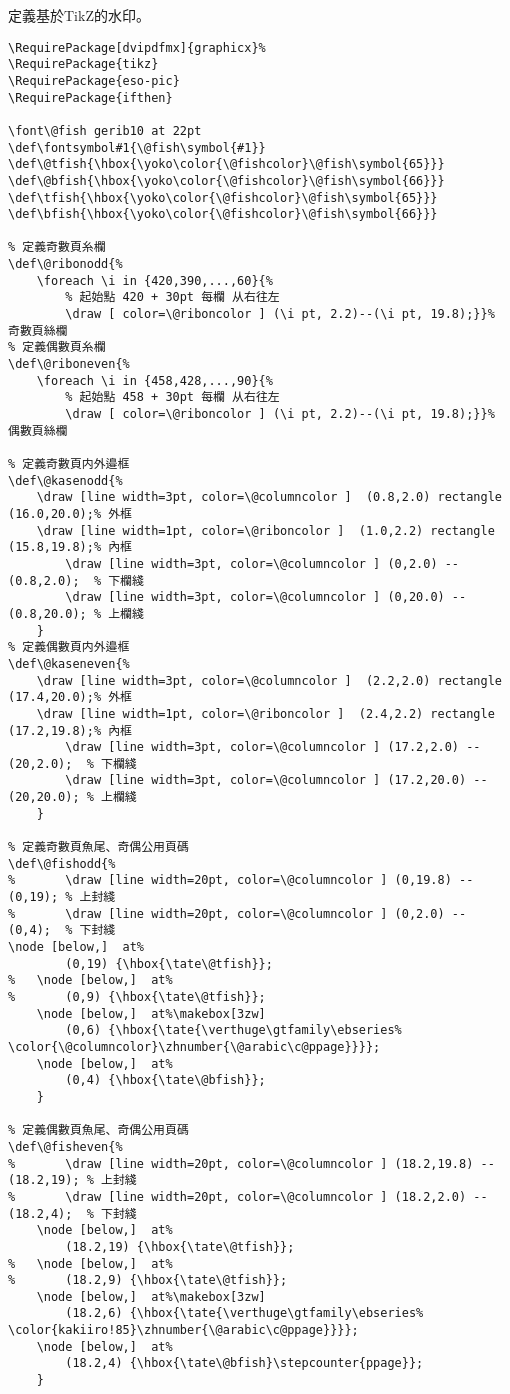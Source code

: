 \par%
定義基於TikZ的水印。
\begin{lstlisting}[firstnumber=417]
%%%%%%	自定義的水印命令 %頁眉、頁碼設置
\RequirePackage[dvipdfmx]{graphicx}%
\RequirePackage{tikz}
\RequirePackage{eso-pic}
\RequirePackage{ifthen}

\font\@fish gerib10 at 22pt
\def\fontsymbol#1{\@fish\symbol{#1}}
\def\@tfish{\hbox{\yoko\color{\@fishcolor}\@fish\symbol{65}}}
\def\@bfish{\hbox{\yoko\color{\@fishcolor}\@fish\symbol{66}}}
\def\tfish{\hbox{\yoko\color{\@fishcolor}\@fish\symbol{65}}}
\def\bfish{\hbox{\yoko\color{\@fishcolor}\@fish\symbol{66}}}

% 定義奇數頁糸欄
\def\@ribonodd{%
	\foreach \i in {420,390,...,60}{%
		% 起始點 420 + 30pt 每欄 从右往左
		\draw [ color=\@riboncolor ] (\i pt, 2.2)--(\i pt, 19.8);}}% 奇數頁絲欄 
% 定義偶數頁糸欄
\def\@riboneven{%
	\foreach \i in {458,428,...,90}{% 
		% 起始點 458 + 30pt 每欄 从右往左
		\draw [ color=\@riboncolor ] (\i pt, 2.2)--(\i pt, 19.8);}}% 偶數頁絲欄 

% 定義奇數頁内外邉框
\def\@kasenodd{%
	\draw [line width=3pt, color=\@columncolor ]  (0.8,2.0) rectangle (16.0,20.0);% 外框 
	\draw [line width=1pt, color=\@riboncolor ]  (1.0,2.2) rectangle (15.8,19.8);% 內框 
		\draw [line width=3pt, color=\@columncolor ] (0,2.0) -- (0.8,2.0);  % 下欄綫
		\draw [line width=3pt, color=\@columncolor ] (0,20.0) -- (0.8,20.0); % 上欄綫
	}
% 定義偶數頁内外邉框
\def\@kaseneven{%
	\draw [line width=3pt, color=\@columncolor ]  (2.2,2.0) rectangle (17.4,20.0);% 外框 
	\draw [line width=1pt, color=\@riboncolor ]  (2.4,2.2) rectangle (17.2,19.8);% 內框 
		\draw [line width=3pt, color=\@columncolor ] (17.2,2.0) -- (20,2.0);  % 下欄綫
		\draw [line width=3pt, color=\@columncolor ] (17.2,20.0) -- (20,20.0); % 上欄綫
	}

% 定義奇數頁魚尾、奇偶公用頁碼
\def\@fishodd{%
%		\draw [line width=20pt, color=\@columncolor ] (0,19.8) -- (0,19); % 上封綫
%		\draw [line width=20pt, color=\@columncolor ] (0,2.0) -- (0,4);  % 下封綫
\node [below,]  at%
		(0,19) {\hbox{\tate\@tfish}};
%	\node [below,]  at%
%		(0,9) {\hbox{\tate\@tfish}};
	\node [below,]  at%\makebox[3zw]
		(0,6) {\hbox{\tate{\verthuge\gtfamily\ebseries%
\color{\@columncolor}\zhnumber{\@arabic\c@ppage}}}};
	\node [below,]  at%
		(0,4) {\hbox{\tate\@bfish}};
	}

% 定義偶數頁魚尾、奇偶公用頁碼
\def\@fisheven{%
%		\draw [line width=20pt, color=\@columncolor ] (18.2,19.8) -- (18.2,19); % 上封綫
%		\draw [line width=20pt, color=\@columncolor ] (18.2,2.0) -- (18.2,4);  % 下封綫
	\node [below,]  at%
		(18.2,19) {\hbox{\tate\@tfish}};
%	\node [below,]  at%
%		(18.2,9) {\hbox{\tate\@tfish}};
	\node [below,]  at%\makebox[3zw]
		(18.2,6) {\hbox{\tate{\verthuge\gtfamily\ebseries%
\color{kakiiro!85}\zhnumber{\@arabic\c@ppage}}}};
	\node [below,]  at%
		(18.2,4) {\hbox{\tate\@bfish}\stepcounter{ppage}};
	}


\end{lstlisting}
